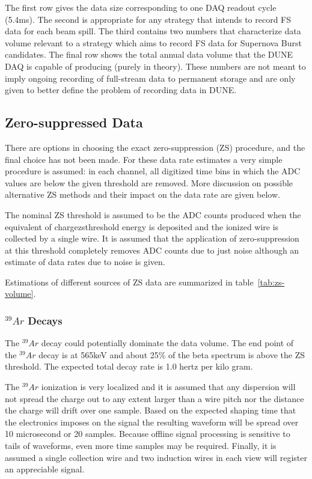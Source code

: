 The first row gives the data size corresponding to one DAQ readout cycle (5.4ms).
The second is appropriate for any strategy that intends to record FS data for each beam spill.
The third contains two numbers that characterize data volume relevant to a strategy which aims
to record FS data for Supernova Burst candidates. The final row  shows the total annual data
volume that the DUNE DAQ is capable of producing (purely in theory).
These numbers are not meant to imply ongoing recording of full-stream
data to permanent storage and are only given to better define the problem of recording data in DUNE.


\subsection{Zero-suppressed Data}

There are options in choosing the exact zero-suppression (ZS) procedure,
and the final choice has not been made. For these data rate estimates a very
simple procedure is assumed: in each channel, all digitized time bins in which the ADC
values are below the given threshold are removed. More discussion on possible alternative
ZS methods and their impact on the data rate are given below.

The nominal ZS threshold is assumed to be the ADC counts produced when
the equivalent of chargezsthreshold energy is deposited and the
ionized wire is collected by a single wire.
It is assumed that the application of zero-suppression at this
threshold completely removes ADC counts due to just noise although an
estimate of data rates due to noise is given.

Estimations of different sources of ZS data are summarized in table~\ref{tab:zs-volume}.

%

\subsubsection{$^{39}Ar$ Decays}

The $^{39}Ar$ decay could potentially dominate the data volume.
The end point of the $^{39}Ar$ decay is at 565keV and about
25\% of the beta spectrum is above the ZS threshold\cite{docdb3018}.
The expected total decay rate is
1.0 hertz per kilo gram\cite{bkds}.

The $^{39}Ar$ ionization is very localized and it is assumed that any
dispersion will not spread the charge out to any extent larger than a
wire pitch nor the distance the charge will drift over one sample.
Based on the expected shaping time that the electronics imposes on the
signal the resulting waveform will be spread over
10 microsecond or 20 samples.
Because offline signal processing is sensitive to tails of waveforms,
even more time samples may be required.
Finally, it is assumed a single collection wire and two induction
wires in each view will register an appreciable signal.

